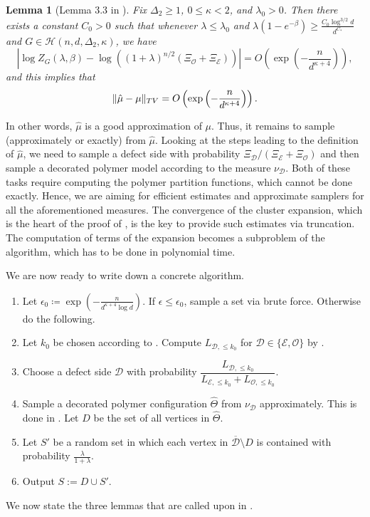 \documentclass[reqno,a4paper,11pt]{amsart}
\newtheorem{lemma}[theorem]{Lemma}
\newcommand{\cD}{\mathcal{D}}
\newcommand{\cE}{\mathcal{E}}
\newcommand{\cO}{\mathcal{O}}
\newcommand{\lam}{\lambda}
\DeclarePairedDelimiter{\norm}{\lVert}{\rVert}
\newcommand{\ex}{\kappa}
\newcommand{\exx}{C_*}
\newcommand{\codeg}{\Delta_2}
\begin{document}
\begin{lemma}[Lemma 3.3 in \cite{GeKaSaWdo25}] \label{lem:approximateZ}
Fix $\codeg \ge 1$, $0 \le \ex < 2$, and $\lam_0>0$. Then there exists a constant $C_0 > 0$ such that whenever $\lam \le \lam_0$ and $\lam(1 - e^{-\beta}) \ge \frac{C_0 \log^{3/2} d}{d^{\exx}}$ and $G \in \mathcal{H}(n,d,\codeg,\ex)$, we have
    \[
    \left| \log Z_G(\lam, \beta) - \log\left((1+ \lam)^{n/2} (\Xi_\cO + \Xi_\cE)\right) \right| = O\left( \exp\left(-\frac{n}{d^{\ex+4}}\right)\right),
    \]
and this implies that
\[
\norm{\hat{\mu} - \mu}_{TV} = O\left( \exp\left(-\frac{n}{d^{\ex+4}}\right)\right).
\]
\end{lemma}

In other words, $\hat\mu$ is a good approximation of $\mu$. Thus, it remains to sample (approximately or exactly) from $\hat\mu$. Looking at the steps leading to the definition of $\hat\mu$, we need to sample a defect side with probability $\Xi_\cD/(\Xi_\cE+\Xi_\cO)$ and then sample a decorated polymer model according to the measure $\nu_\cD$. Both of these tasks require computing the polymer partition functions, which cannot be done exactly. Hence, we are aiming for efficient estimates and approximate samplers for all the aforementioned measures. The convergence of the cluster expansion, which is the heart of the proof of , is the key to provide such estimates via truncation. The computation of terms of the expansion becomes a subproblem of the algorithm, which has to be done in polynomial time. 

We are now ready to write down a concrete algorithm.

\begin{algorithm}[H]
    \caption{Approximate Sampler for the Ising model\label{alg:main}}
    \begin{enumerate}
        \item Let $\epsilon_0 \coloneqq \exp\left(- \frac{n}{d^{\ex+4} \log d} \right)$. If $\epsilon\leq \epsilon_0$, sample a set via brute force. Otherwise do the following.
        \item Let $k_0$ be chosen according to . Compute $L_{\cD,\leq k_0}$ for $\cD\in\{\cE,\cO\}$ by .
        \item Choose a defect side $\cD$ with probability $\dfrac{L_{\cD,\leq k_0}}{L_{\cE,\leq k_0}+L_{\cO,\leq k_0}}$.
        \item Sample a decorated polymer configuration $\hat{\Theta}$ from $\nu_\cD$ approximately. This is done in . Let $D$ be the set of all vertices in $\hat\Theta$.
        \item Let $S'$ be a random set in which each vertex in $\overline{\cD}\setminus D$ is contained with probability $\frac{\lam}{1+\lam}$.
        \item Output $S:=D\cup S'$.
    \end{enumerate}
\end{algorithm}
We now state the three lemmas that are called upon in .
\end{document}
